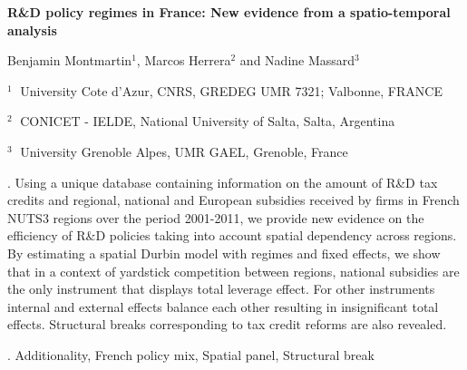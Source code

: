 \documentclass[12pt]{article}
\begin{document}
\begin{flushleft}


{\LARGE\bf R\&D policy regimes in France: New evidence from a spatio-temporal
analysis}


\vspace{1.0cm}

Benjamin Montmartin$^1$, Marcos Herrera$^2$ and Nadine Massard$^3$

\begin{description}

\item $^1 \;$ University Cote d'Azur, CNRS, GREDEG UMR 7321; Valbonne, FRANCE

\item $^2 \;$ CONICET - IELDE, National University of Salta,
Salta, Argentina

\item $^3 \;$ University Grenoble Alpes, UMR GAEL, Grenoble, France

\end{description}

\end{flushleft}


\vspace{0.75cm}

. Using a unique database containing information on the amount of R\&D
tax credits and regional, national and European subsidies received
by firms in French NUTS3 regions over the period 2001-2011, we provide
new evidence on the efficiency of R\&D policies taking into account
spatial dependency across regions. By estimating a spatial Durbin
model with regimes and fixed effects, we show that in a context of
yardstick competition between regions, national subsidies are the
only instrument that displays total leverage effect. For other instruments
internal and external effects balance each other resulting in insignificant
total effects. Structural breaks corresponding to tax credit reforms
are also revealed.

\vskip 2mm

.
 Additionality, French policy mix, Spatial panel, Structural break
\end{document}
